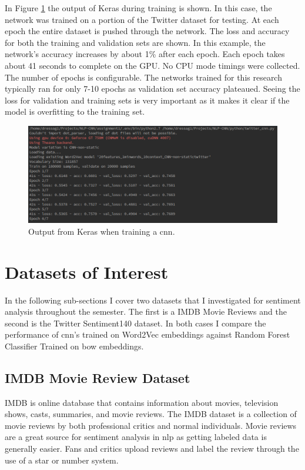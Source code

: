 \documentclass[12pt]{article}
\begin{document}
In Figure \ref{fig:training} the output of Keras during training is shown. In this case, the network was trained on a portion of the Twitter dataset for testing. At each epoch the entire dataset is pushed through the network. The loss and accuracy for both the training and validation sets are shown. In this example, the network's accuracy increases by about 1\% after each epoch. Each epoch takes about 41 seconds to complete on the GPU. No CPU mode timings were collected. The number of epochs is configurable. The networks trained for this research typically ran for only 7-10 epochs as validation set accuracy plateaued. Seeing the loss for validation and training sets is very important as it makes it clear if the model is overfitting to the training set.

\begin{figure}[!htbp]
	\centering
	\includegraphics[scale=.4]{training.png}
	\caption{Output from Keras when training a \ac{cnn}.}
	\label{fig:training}
\end{figure}

\section {Datasets of Interest}

In the following sub-sections I cover two datasets that I investigated for sentiment analysis throughout the semester. The first is a IMDB Movie Reviews and the second is the Twitter Sentiment140 dataset. In both cases I compare the performance of \ac{cnn}'s trained on Word2Vec embeddings against Random Forest Classifier Trained on \ac{bow} embeddings.

\subsection{IMDB Movie Review Dataset}

IMDB is online database that contains information about movies, television shows, casts, summaries, and movie reviews. The IMDB dataset is a collection of movie reviews by both professional critics and normal individuals. Movie reviews are a great source for sentiment analysis in \ac{nlp} as getting labeled data is generally easier. Fans and critics upload reviews and  label the review through the use of a star or number system.
\end{document}
